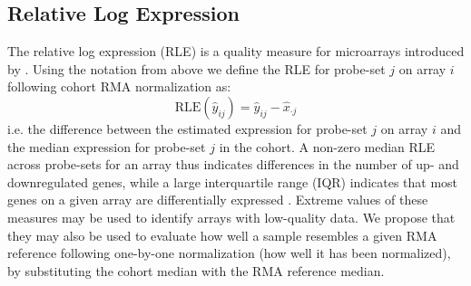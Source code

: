 \documentclass{article}
\begin{document}
\subsection*{Relative Log Expression} 
The relative log expression (RLE)	is a quality measure for microarrays introduced by \mbox{\citet{Bolstad2004b}}. Using the notation from above we define the RLE for probe-set $j$ on array $i$ following cohort RMA normalization as:
\[
	\textrm{RLE}(\hat{y}_{ij}) = \hat{y}_{ij} - \hat{x}_{\cdot j}
\]
i.e. the difference between the estimated expression for probe-set $j$ on array $i$ and the median expression for probe-set $j$ in the cohort. A non-zero median RLE across probe-sets for an array thus indicates differences in the number of up- and downregulated genes, while a large interquartile range (IQR) indicates that most genes on a given array are differentially expressed \mbox{\citep{McCall2011}}. Extreme values of these measures may be used to identify arrays with low-quality data. We propose that they may also be used to evaluate how well a sample resembles a given RMA reference following one-by-one normalization (how well it has been normalized), by substituting the cohort median with the RMA reference median.
\end{document}
